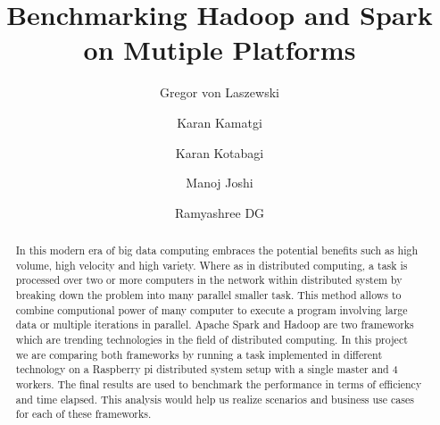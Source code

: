 
\title{Benchmarking Hadoop and Spark on Mutiple Platforms}

\author{Gregor von Laszewski}

\author{Karan Kamatgi}

\author{Karan Kotabagi}

\author{Manoj Joshi}

\author{Ramyashree DG}

\renewcommand{\shortauthors}{G. v. Laszewski, Karan Kamatgi, 
  Karan Kotabagi, Manoj Joshi, Ramyashree DG}
  
\begin{abstract}

In this modern era of big data computing embraces the potential benefits such as 
high volume, high velocity and high variety. Where as in distributed computing, 
a task is processed over two or more computers in the network within distributed
 system by breaking down the problem into many parallel smaller task. This 
 method allows to combine computional power of many computer to execute a 
 program involving large data or multiple iterations in parallel. Apache Spark 
 and Hadoop are two frameworks which are trending technologies in the field of 
 distributed computing. In this project we are comparing both frameworks by 
 running a task implemented in different technology on a Raspberry pi 
 distributed system setup with a single master and 4 workers. The final results 
 are used to benchmark the performance in terms of efficiency and time elapsed. 
 This analysis would help us realize scenarios and business use cases for each 
 of these frameworks.

\end{abstract}

